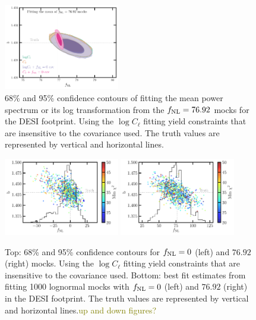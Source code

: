 \begin{figure}
    \centering
    \includegraphics[width=0.45\textwidth]{figures/mcmc_po100.pdf} 
    \caption{68\% and 95\% confidence contours of fitting the mean power spectrum or its log transformation from the $f_{\rm NL}=76.92$ mocks for the DESI footprint. Using the $\log C_{\ell}$ fitting yield constraints that are insensitive to the covariance used. The truth values are represented by vertical and horizontal lines.}\label{fig:mcmc_mocks100}
\end{figure}

\begin{figure}
    \centering
    \includegraphics[width=0.45\textwidth]{figures/bestfit_zero.pdf} 
    \includegraphics[width=0.45\textwidth]{figures/bestfit_po100.pdf}         
    \caption{Top: 68\% and 95\% confidence contours for $f_{\rm NL}=0$ (left) and $76.92$ (right) mocks. Using the $\log C_{\ell}$ fitting yield constraints that are insensitive to the covariance used. Bottom: best fit estimates from fitting 1000 lognormal mocks with $f_{\rm NL}=0$ (left) and $76.92$ (right) in the DESI footprint. The truth values are represented by vertical and horizontal lines.\textcolor{olive}{up and down figures?}}\label{fig:bestfit_mocks}
\end{figure}




